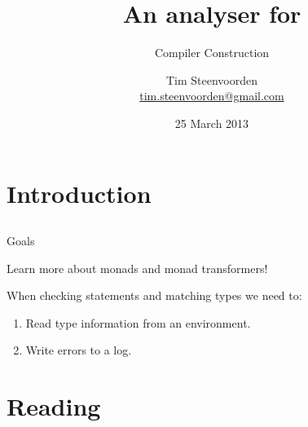 

  {} 
  {}



\subtitle {Compiler Construction}
\title    {An analyser for \SPL}
\author   [Tim Steenvoorden]
          {Tim Steenvoorden\\
           \medskip
           {\small \url{tim.steenvoorden@gmail.com}}}%
\date     {25 March 2013}

\begin{frame}
  \titlepage
\end{frame}


\section{Introduction}
\subsection*{}

\begin{frame}{Goals}
  
  Learn more about monads and monad transformers!


  \pause
  \bigskip
  When checking statements and matching types we need to:

  \begin{enumerate}
    \item Read type information from an environment.
    \item Write errors to a log.
  \end{enumerate}

\end{frame}

\section{Reading}
\subsection*{}

